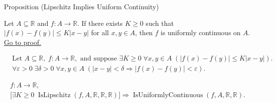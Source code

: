 \begin{propositionbox}{Proposition (Lipschitz Implies Uniform Continuity)}
\begin{proposition}
\label{prop:lipschitz-implies-uc}
Let $A \subseteq \mathbb{R}$ and $f:A \to \mathbb{R}$. If there exists $K \ge 0$ such that $|f(x)-f(y)| \le K |x-y|$ for all $x,y \in A$, then $f$ is uniformly continuous on $A$.
\hyperref[prf:lipschitz-implies-uc]{Go to proof.}
\end{proposition}
\end{propositionbox}

\begin{remark*}
\[
\begin{aligned}
&\text{Let } A \subseteq \mathbb{R},\; f:A \to \mathbb{R},\text{ and suppose }\exists K \ge 0\;\forall x,y \in A\;( |f(x)-f(y)| \le K |x-y|).\\
&\forall \varepsilon > 0\;\exists \delta > 0\;\forall x,y \in A\;(|x-y| < \delta \Rightarrow |f(x)-f(y)| < \varepsilon).
\end{aligned}
\]
\end{remark*}

\begin{remark*}
\[
\begin{aligned}
  f\colon A\to\mathbb{R},\\
\bigl[\exists K \ge 0\; \operatorname{IsLipschitz}(f,A,\mathbb{R},\mathbb{R},\mathbb{R})\bigr] \Rightarrow \operatorname{IsUniformlyContinuous}(f,A,\mathbb R,\mathbb R).
\end{aligned}
\]
\end{remark*}

